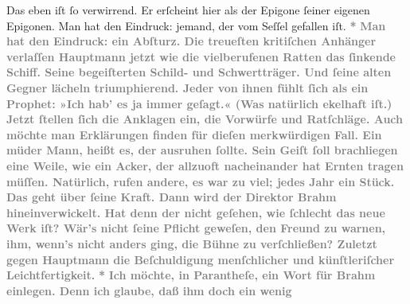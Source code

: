 \begin{ledgroupsized}[t]{13cm}
{{                  Das eben iſt ſo verwirrend. Er erſcheint hier als der Epigone ſeiner eigenen
                  Epigonen. Man hat den Eindruck: jemand, der vom Seſſel gefallen iſt.}}\pend
           \pstart
           \centering{}\textcolor{gray}{\textbf{*}}\pend
           \pstart
           \noindent{}\textcolor{gray}{\textbf{ Man hat den Eindruck: ein Abſturz. Die treueſten kritiſchen
                  Anhänger verlaſſen Hauptmann jetzt wie die
                  vielberufenen Ratten das ſinkende Schiff. Seine begeiſterten Schild- und
                  Schwertträger. Und ſeine alten Gegner lächeln triumphierend. Jeder von ihnen fühlt
                  ſich als ein Prophet: »Ich hab’ es ja immer geſagt.« (Was natürlich ekelhaft iſt.)
                  Jetzt ſtellen ſich die Anklagen ein, die Vorwürfe und Ratſchläge. Auch möchte man
                  Erklärungen finden für dieſen merkwürdigen Fall. Ein müder Mann, heißt es, der
                  ausruhen ſollte. Sein Geiſt ſoll brachliegen eine Weile, wie ein Acker, der
                  allzuoft nacheinander hat Ernten tragen müſſen. Natürlich, rufen andere, es war zu
                  viel; jedes Jahr ein Stück. Das geht über ſeine Kraft. Dann wird der Direktor Brahm hineinverwickelt. Hat denn der nicht
                  geſehen, wie ſchlecht das neue Werk iſt? Wär’s nicht ſeine Pflicht geweſen, den Freund zu warnen, ihm, wenn’s nicht
                  anders ging, die Bühne zu
                  verſchließen? Zuletzt gegen Hauptmann die
                  Beſchuldigung menſchlicher und künſtleriſcher Leichtfertigkeit.}}\pend
           \pstart
           \centering{}\textcolor{gray}{\textbf{*}}\pend
           \pstart
           \noindent{}\textcolor{gray}{\textbf{Ich möchte, in Parantheſe, ein Wort für Brahm einlegen. Denn ich glaube, daß ihm doch ein wenig
}}
\end{ledgroupsized}
